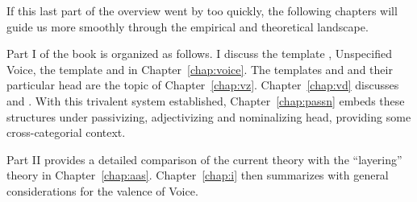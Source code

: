 If this last part of the overview went by too quickly, the following chapters will guide us more smoothly through the empirical and theoretical landscape.

Part I of the book is organized as follows. I discuss the template {\tkal}, Unspecified Voice, the template {\tpie} and {\va} in Chapter~\ref{chap:voice}. The templates {\tnif} and {\thit} and their particular head {\vz} are the topic of Chapter~\ref{chap:vz}. Chapter~\ref{chap:vd} discusses {\thif} and {\vd}. With this trivalent system established, Chapter~\ref{chap:passn} embeds these structures under passivizing, adjectivizing and nominalizing head, providing some cross-categorial context.

Part II provides a detailed comparison of the current theory with the ``layering'' theory in Chapter~\ref{chap:aas}. Chapter~\ref{chap:i} then summarizes with general considerations for the valence of Voice.


